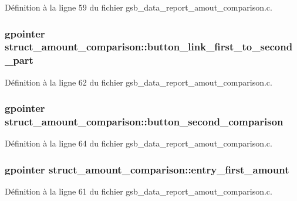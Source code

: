 Définition à la ligne 59 du fichier gsb\_\-data\_\-report\_\-amout\_\-comparison.c.

\subsubsection[{button\_\-link\_\-first\_\-to\_\-second\_\-part}]{\setlength{\rightskip}{0pt plus 5cm}gpointer {\bf struct\_\-amount\_\-comparison::button\_\-link\_\-first\_\-to\_\-second\_\-part}}\label{structstruct__amount__comparison_aac3846024bbb10f2db92dbcfea3958c4}


Définition à la ligne 62 du fichier gsb\_\-data\_\-report\_\-amout\_\-comparison.c.

\subsubsection[{button\_\-second\_\-comparison}]{\setlength{\rightskip}{0pt plus 5cm}gpointer {\bf struct\_\-amount\_\-comparison::button\_\-second\_\-comparison}}\label{structstruct__amount__comparison_a0501875d238cd1c61cf6cff9b30074f3}


Définition à la ligne 64 du fichier gsb\_\-data\_\-report\_\-amout\_\-comparison.c.

\subsubsection[{entry\_\-first\_\-amount}]{\setlength{\rightskip}{0pt plus 5cm}gpointer {\bf struct\_\-amount\_\-comparison::entry\_\-first\_\-amount}}\label{structstruct__amount__comparison_a4be408287856a6d7d40c10e8f64983ed}


Définition à la ligne 61 du fichier gsb\_\-data\_\-report\_\-amout\_\-comparison.c.

